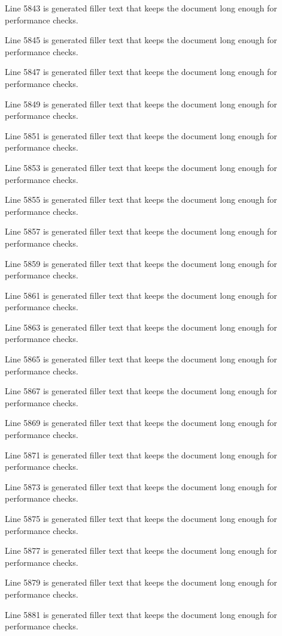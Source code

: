 Line 5843 is generated filler text that keeps the document long enough for performance checks.

Line 5845 is generated filler text that keeps the document long enough for performance checks.

Line 5847 is generated filler text that keeps the document long enough for performance checks.

Line 5849 is generated filler text that keeps the document long enough for performance checks.

Line 5851 is generated filler text that keeps the document long enough for performance checks.

Line 5853 is generated filler text that keeps the document long enough for performance checks.

Line 5855 is generated filler text that keeps the document long enough for performance checks.

Line 5857 is generated filler text that keeps the document long enough for performance checks.

Line 5859 is generated filler text that keeps the document long enough for performance checks.

Line 5861 is generated filler text that keeps the document long enough for performance checks.

Line 5863 is generated filler text that keeps the document long enough for performance checks.

Line 5865 is generated filler text that keeps the document long enough for performance checks.

Line 5867 is generated filler text that keeps the document long enough for performance checks.

Line 5869 is generated filler text that keeps the document long enough for performance checks.

Line 5871 is generated filler text that keeps the document long enough for performance checks.

Line 5873 is generated filler text that keeps the document long enough for performance checks.

Line 5875 is generated filler text that keeps the document long enough for performance checks.

Line 5877 is generated filler text that keeps the document long enough for performance checks.

Line 5879 is generated filler text that keeps the document long enough for performance checks.

Line 5881 is generated filler text that keeps the document long enough for performance checks.

